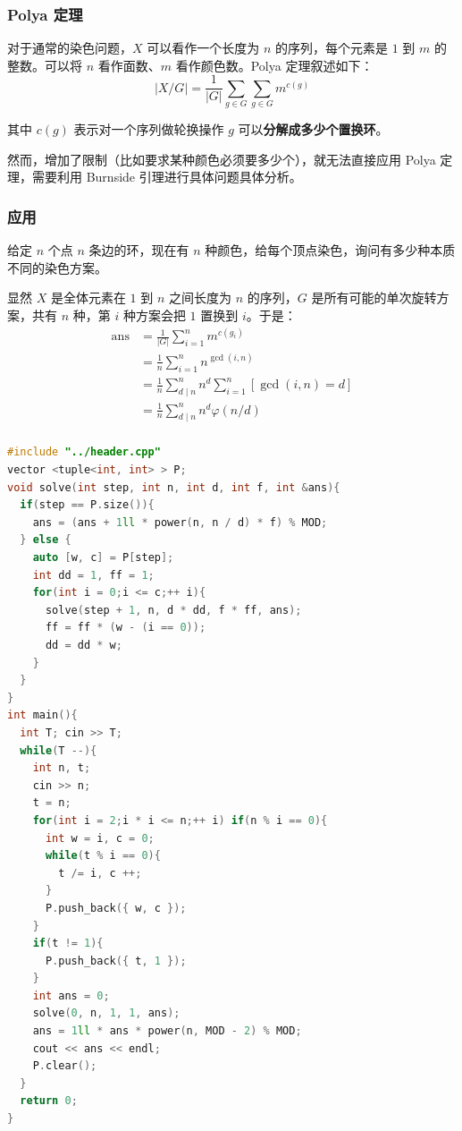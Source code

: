 \documentclass[10pt]{ctexart}
\begin{document}
\begin{multicols}{3}
    \subsubsection{Polya 定理}\label{polya-ux5b9aux7406-1}

    对于通常的染色问题，\(X\) 可以看作一个长度为 \(n\)
    的序列，每个元素是 \(1\) 到 \(m\) 的整数。可以将 \(n\)
    看作面数、\(m\) 看作颜色数。Polya 定理叙述如下：\[
    |X / G| = \frac{1}{|G|} \sum_{g\in G}\sum_{g\in G} m^{c(g)}
    \]

    其中 \(c(g)\) 表示对一个序列做轮换操作 \(g\)
    可以\textbf{分解成多少个置换环}。

    然而，增加了限制（比如要求某种颜色必须要多少个），就无法直接应用
    Polya 定理，需要利用 Burnside 引理进行具体问题具体分析。

    \subsubsection{应用}\label{ux5e94ux7528-1}

    给定 \(n\) 个点 \(n\) 条边的环，现在有 \(n\)
    种颜色，给每个顶点染色，询问有多少种本质不同的染色方案。

    显然 \(X\) 是全体元素在 \(1\) 到 \(n\) 之间长度为 \(n\)
    的序列，\(G\) 是所有可能的单次旋转方案，共有 \(n\) 种，第 \(i\)
    种方案会把 \(1\) 置换到 \(i\)。于是：\[
    \begin{aligned}
    \mathrm{ans} &= \frac{1}{|G|} \sum_{i=1}^n m^{c(g_i)} \\
    &= \frac{1}{n} \sum_{i=1}^{n} n^{\gcd(i,n)} \\
    &= \frac{1}{n} \sum_{d\mid n}^n n^{d} \sum_{i=1}^n [\gcd(i,n) = d] \\
    &= \frac{1}{n} \sum_{d\mid n}^n n^{d} \varphi(n/d) \\
    \end{aligned}
    \]

\begin{lstlisting}[language={C++}]
#include "../header.cpp"
vector <tuple<int, int> > P;
void solve(int step, int n, int d, int f, int &ans){
  if(step == P.size()){
    ans = (ans + 1ll * power(n, n / d) * f) % MOD;
  } else {
    auto [w, c] = P[step];
    int dd = 1, ff = 1;
    for(int i = 0;i <= c;++ i){
      solve(step + 1, n, d * dd, f * ff, ans);
      ff = ff * (w - (i == 0));
      dd = dd * w;
    }
  }
}
int main(){
  int T; cin >> T;
  while(T --){
    int n, t;
    cin >> n;
    t = n;
    for(int i = 2;i * i <= n;++ i) if(n % i == 0){
      int w = i, c = 0;
      while(t % i == 0){
        t /= i, c ++;
      }
      P.push_back({ w, c });
    }
    if(t != 1){
      P.push_back({ t, 1 });
    }
    int ans = 0;
    solve(0, n, 1, 1, ans);
    ans = 1ll * ans * power(n, MOD - 2) % MOD;
    cout << ans << endl;
    P.clear();
  }
  return 0;
}
\end{lstlisting}


\end{multicols}
\end{document}
